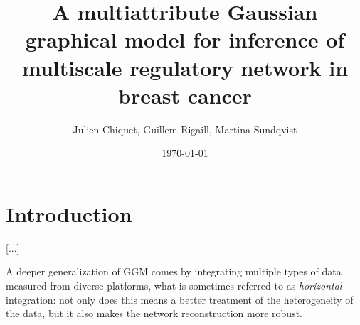 \documentclass[a4paper]{article}
\title{A multiattribute Gaussian graphical model for inference of
  multiscale regulatory network in breast cancer}
\date{\today}
\author{Julien Chiquet, Guillem Rigaill, Martina Sundqvist}
\begin{document}
\maketitle

\section{Introduction}


[...]

A deeper generalization of GGM comes by integrating multiple types of
data measured from diverse platforms, what is sometimes referred to as
\emph{horizontal} integration: not only does this means a better
treatment of the heterogeneity of the data, but it also makes the
network reconstruction more robust.











\end{document}
